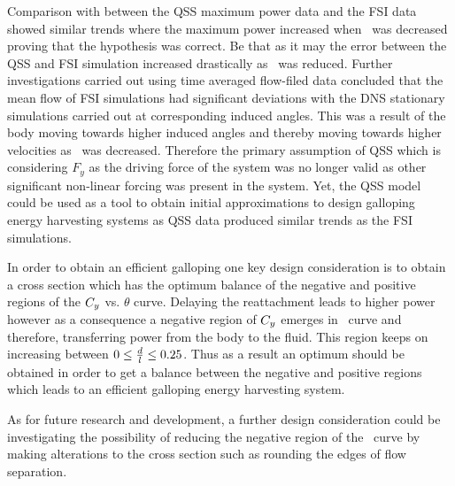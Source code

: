 Comparison with between the QSS maximum power data and the FSI data showed similar trends where the maximum power increased when \ratio\ was decreased proving that the hypothesis was correct. Be that as it may the error between the QSS and FSI simulation increased drastically as \ratio\ was reduced. Further investigations carried out using time averaged flow-filed data concluded that the mean flow of FSI simulations had significant deviations with the DNS stationary simulations carried out at corresponding induced angles. This was a result of the body moving towards higher induced angles and thereby moving towards higher velocities as \ratio\ was decreased. Therefore the primary assumption of QSS which is considering $F_y$ as the driving force of the system was no longer valid as other significant non-linear forcing was present in the system. Yet, the QSS model could be used as a tool to obtain initial approximations to design galloping energy harvesting systems as QSS data produced similar trends as the FSI simulations.

In order to obtain an efficient galloping one key design consideration is to obtain a cross section which has the optimum balance of the negative and positive regions of the $C_{y}$ vs. $\theta$ curve. Delaying the reattachment leads to higher power however as a consequence a negative region of $C_{y}$ emerges in \cy\ curve and therefore, transferring power from the body to the fluid. This region keeps on increasing between $0\leq\frac{d}{l}\leq0.25$. Thus as a result an optimum \ratio should be obtained in order to get a balance between the negative and positive regions which leads to an efficient galloping energy harvesting system. 

As for future research and development, a further design consideration could be investigating the possibility of reducing the negative region of the \cy\ curve by making alterations to the cross section such as rounding the edges of flow separation. 

 

      




